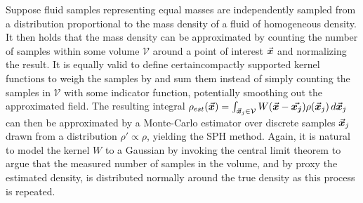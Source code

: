 Suppose fluid samples representing equal masses are independently sampled from a distribution proportional to the mass density of a fluid of homogeneous density. It then holds that the mass density can be approximated by counting the number of samples within some volume $\mathcal{V}$ around a point of interest $\vec{\bm{x}}$ and normalizing the result\autocite{smoothed-density-parzen-62}. It is equally valid to define certaincompactly supported kernel functions to weigh the samples by and sum them instead of simply counting the samples in $\mathcal{V}$ with some indicator function, potentially smoothing out the approximated field\autocite*{smoothed-density-parzen-62}. The resulting integral\autocite*{sph-monaghan-gingold-77} $\rho_{est}(\vec{\bm{x}}) = \int_{\vec{\bm{x}}_j\in\mathcal{V}} W(\vec{\bm{x}}-\vec{\bm{x_j}})\rho(\vec{\bm{x}}_j)\,d\vec{\bm{x}}_j$ can then be approximated by a Monte-Carlo estimator over discrete samples $\vec{\bm{x}}_j$ drawn from a distribution $\rho' \propto \rho$, yielding the SPH method\autocite*{sph-monaghan-gingold-77}. Again, it is natural to model the kernel $W$ to a Gaussian by invoking the central limit theorem to argue that the measured number of samples in the volume, and by proxy the estimated density, is distributed normally around the true density as this process is repeated.

\horizontalspacer

